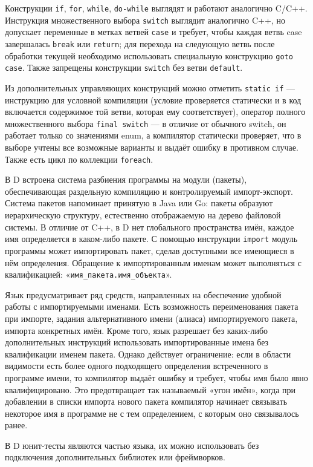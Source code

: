 \documentclass{studrep}
\begin{document}
Конструкции \texttt{if}, \texttt{for}, \texttt{while}, \texttt{do-while} выглядят и работают аналогично C/C++. Инструкция множественного выбора \texttt{switch} выглядит аналогично C++, но допускает переменные в метках ветвей \texttt{case} и требует, чтобы каждая ветвь case завершалась \texttt{break} или \texttt{return}; для перехода на следующую ветвь после обработки текущей необходимо использовать специальную конструкцию \texttt{goto case}. Также запрещены конструкции \texttt{switch} без ветви \texttt{default}.

Из дополнительных управляющих конструкций можно отметить \texttt{static if} — инструкцию для условной компиляции (условие проверяется статически и в код включается содержимое той ветви, которая ему соответствует), оператор полного множественного выбора \texttt{final switch} — в отличие от обычного switch, он работает только со значениями enum, а компилятор статически проверяет, что в выборе учтены все возможные варианты и выдаёт ошибку в противном случае. Также есть цикл по коллекции \texttt{foreach}.

В D встроена система разбиения программы на модули (пакеты), обеспечивающая раздельную компиляцию и контролируемый импорт-экспорт. Система пакетов напоминает принятую в Java или Go: пакеты образуют иерархическую структуру, естественно отображаемую на дерево файловой системы. В отличие от C++, в D нет глобального пространства имён, каждое имя определяется в каком-либо пакете. С помощью инструкции \texttt{import} модуль программы может импортировать пакет, сделав доступными все имеющиеся в нём определения. Обращение к импортированным именам может выполняться с квалификацией: «\texttt{имя_пакета.имя_объекта}».

Язык предусматривает ряд средств, направленных на обеспечение удобной работы с импортируемыми именами. Есть возможность переименования пакета при импорте, задания альтернативного имени (алиаса) импортируемого пакета, импорта конкретных имён. Кроме того, язык разрешает без каких-либо дополнительных инструкций использовать импортированные имена без квалификации именем пакета. Однако действует ограничение: если в области видимости есть более одного подходящего определения встреченного в программе имени, то компилятор выдаёт ошибку и требует, чтобы имя было явно квалифицировано. Это предотвращает так называемый «угон имён», когда при добавлении в списки импорта нового пакета компилятор начинает связывать некоторое имя в программе не с тем определением, с которым оно связывалось ранее.

В D юнит-тесты являются частью языка, их можно использовать без подключения дополнительных библиотек или фреймворков.
\end{document}
